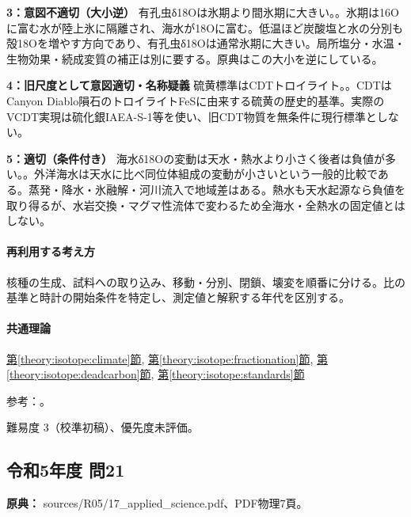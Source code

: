 \noindent\textbf{3：意図不適切（大小逆）} 有孔虫δ18Oは氷期より間氷期に大きい。。氷期は16Oに富む水が陸上氷に隔離され、海水が18Oに富む。低温ほど炭酸塩と水の分別も殻18Oを増やす方向であり、有孔虫δ18Oは通常氷期に大きい。局所塩分・水温・生物効果・続成変質の補正は別に要する。原典はこの大小を逆にしている。\par

\noindent\textbf{4：旧尺度として意図適切・名称疑義} 硫黄標準はCDTトロイライト。。CDTはCanyon Diablo隕石のトロイライトFeSに由来する硫黄の歴史的基準。実際のVCDT実現は硫化銀IAEA-S-1等を使い、旧CDT物質を無条件に現行標準としない。\par

\noindent\textbf{5：適切（条件付き）} 海水δ18Oの変動は天水・熱水より小さく後者は負値が多い。。外洋海水は天水に比べ同位体組成の変動が小さいという一般的比較である。蒸発・降水・氷融解・河川流入で地域差はある。熱水も天水起源なら負値を取り得るが、水岩交換・マグマ性流体で変わるため全海水・全熱水の固定値とはしない。\par

\paragraph{再利用する考え方} 核種の生成、試料への取り込み、移動・分別、閉鎖、壊変を順番に分ける。比の基準と時計の開始条件を特定し、測定値と解釈する年代を区別する。

\paragraph{共通理論} \hyperref[theory:isotope:climate]{第\ref*{theory:isotope:climate}節}, \hyperref[theory:isotope:fractionation]{第\ref*{theory:isotope:fractionation}節}, \hyperref[theory:isotope:deadcarbon]{第\ref*{theory:isotope:deadcarbon}節}, \hyperref[theory:isotope:standards]{第\ref*{theory:isotope:standards}節}

\par 参考：\cite{iso_oxygen,iso_deadcarbon,iso_standards1995,iso_vcdt,iso_hydrothermal}。

\par 難易度 3（校準初稿）、優先度未評価。

\subsection{令和5年度 問21}
\label{q:r05-reg-applied-21}

\noindent\textbf{原典：} sources/R05/17\_applied\_science.pdf、PDF物理7頁。

